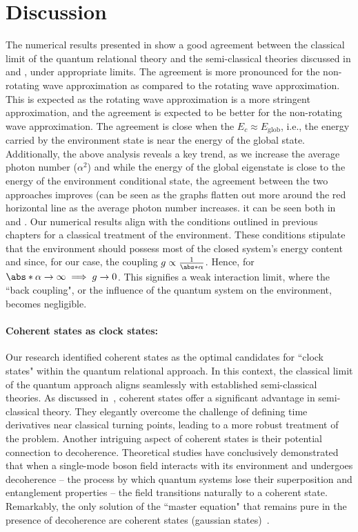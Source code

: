 \newpage 


\section{Discussion}
The numerical results presented in  show a good agreement 
between the classical limit of the quantum relational theory and the semi-classical theories
discussed in  and , under appropriate limits. 
The agreement is more pronounced for the non-rotating wave approximation as compared to the rotating 
wave approximation. This is expected as the rotating wave approximation is a more stringent approximation, and the
agreement is expected to be better for the non-rotating wave approximation.
The agreement is close when the \(E_c \approx E_{\mathrm{glob}}\), 
i.e., the energy carried by the environment state is near the energy of the global state. Additionally,  the above analysis reveals a key trend, as we increase the average photon number (\(\alpha^2\)) and while the energy 
of the global eigenstate
is close to the energy of the environment conditional state, the agreement between the two approaches improves (can be seen as the graphs flatten out more around the red horizontal line as the average photon number increases.
it can be seen both in 
 and . 
Our numerical results align with the conditions outlined in previous chapters for a classical treatment of the environment. These conditions stipulate that the environment should possess most of the closed system's energy content and since, for our case, the coupling \(g \propto \frac{1}{\abs*{\alpha}}\). Hence, for \(\abs*{\alpha} \to \infty \implies g \to 0\). This signifies a weak interaction limit, where the ``back coupling", or the influence of the quantum system on the environment, becomes negligible.

\paragraph{Coherent states as clock states:} Our research identified coherent states as the optimal candidates for ``clock states" within the quantum relational approach.  In this context, the classical limit of the quantum approach aligns seamlessly with established semi-classical theories.  As discussed in~\cite{braun2004classical}, coherent states offer a significant advantage in semi-classical theory. They elegantly overcome the challenge of defining time derivatives near classical turning points, leading to a more robust treatment of the problem. 
Another intriguing aspect of coherent states is their potential connection to decoherence. Theoretical studies have conclusively demonstrated that when a single-mode boson field interacts with its environment and undergoes decoherence – the process by which quantum systems lose their superposition and entanglement properties – the field transitions naturally to a coherent state.  Remarkably, the only solution of the ``master equation" that remains pure in the presence of decoherence are coherent states (gaussian states)~\cite{dutra1998decoherence, zuerk_coherent_state_1993}. 


